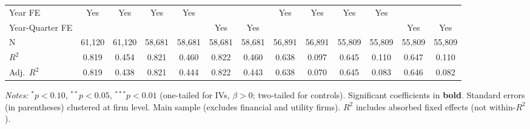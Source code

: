 \documentclass[11pt,a4paper]{article}
\begin{document}
\begin{table}[htbp]
\begin{tabular}{lcccccccccccc}
Year FE & Yes & Yes & Yes & Yes &  &  & Yes & Yes & Yes & Yes &  &  \\
Year-Quarter FE &  &  &  &  & Yes & Yes &  &  &  &  & Yes & Yes \\
\midrule
N & 61,120 & 61,120 & 58,681 & 58,681 & 58,681 & 58,681 & 56,891 & 56,891 & 55,809 & 55,809 & 55,809 & 55,809 \\
$R^2$ & 0.819 & 0.454 & 0.821 & 0.460 & 0.822 & 0.460 & 0.638 & 0.097 & 0.645 & 0.110 & 0.647 & 0.110 \\
Adj.~$R^2$ & 0.819 & 0.438 & 0.821 & 0.444 & 0.822 & 0.443 & 0.638 & 0.070 & 0.645 & 0.083 & 0.646 & 0.082 \\
\bottomrule
\end{tabular}
\begin{minipage}{\linewidth}
\vspace{2pt}\scriptsize
\textit{Notes:} $^{*}p<0.10$, $^{**}p<0.05$, $^{***}p<0.01$ (one-tailed for IVs, $\beta > 0$; two-tailed for controls).
 Significant coefficients in \textbf{bold}.
 Standard errors (in parentheses) clustered at firm level.
 Main sample (excludes financial and utility firms).
 $R^2$ includes absorbed fixed effects (not within-$R^2$).
\end{minipage}
\end{table}
\clearpage
\end{document}
